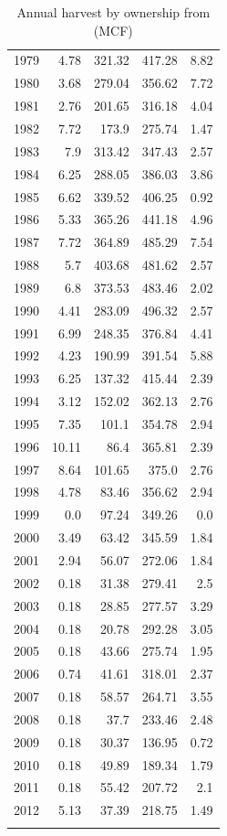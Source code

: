 \documentclass[a4paper,titlepage]{article}
\begin{document}
\begin{longtable}{rrrrr}
1979 & 4.78 & 321.32 & 417.28 & 8.82\\
1980 & 3.68 & 279.04 & 356.62 & 7.72\\
1981 & 2.76 & 201.65 & 316.18 & 4.04\\
1982 & 7.72 & 173.9 & 275.74 & 1.47\\
1983 & 7.9 & 313.42 & 347.43 & 2.57\\
1984 & 6.25 & 288.05 & 386.03 & 3.86\\
1985 & 6.62 & 339.52 & 406.25 & 0.92\\
1986 & 5.33 & 365.26 & 441.18 & 4.96\\
1987 & 7.72 & 364.89 & 485.29 & 7.54\\
1988 & 5.7 & 403.68 & 481.62 & 2.57\\
1989 & 6.8 & 373.53 & 483.46 & 2.02\\
1990 & 4.41 & 283.09 & 496.32 & 2.57\\
1991 & 6.99 & 248.35 & 376.84 & 4.41\\
1992 & 4.23 & 190.99 & 391.54 & 5.88\\
1993 & 6.25 & 137.32 & 415.44 & 2.39\\
1994 & 3.12 & 152.02 & 362.13 & 2.76\\
1995 & 7.35 & 101.1 & 354.78 & 2.94\\
1996 & 10.11 & 86.4 & 365.81 & 2.39\\
1997 & 8.64 & 101.65 & 375.0 & 2.76\\
1998 & 4.78 & 83.46 & 356.62 & 2.94\\
1999 & 0.0 & 97.24 & 349.26 & 0.0\\
2000 & 3.49 & 63.42 & 345.59 & 1.84\\
2001 & 2.94 & 56.07 & 272.06 & 1.84\\
2002 & 0.18 & 31.38 & 279.41 & 2.5\\
2003 & 0.18 & 28.85 & 277.57 & 3.29\\
2004 & 0.18 & 20.78 & 292.28 & 3.05\\
2005 & 0.18 & 43.66 & 275.74 & 1.95\\
2006 & 0.74 & 41.61 & 318.01 & 2.37\\
2007 & 0.18 & 58.57 & 264.71 & 3.55\\
2008 & 0.18 & 37.7 & 233.46 & 2.48\\
2009 & 0.18 & 30.37 & 136.95 & 0.72\\
2010 & 0.18 & 49.89 & 189.34 & 1.79\\
2011 & 0.18 & 55.42 & 207.72 & 2.1\\
2012 & 5.13 & 37.39 & 218.75 & 1.49\\
\caption{Annual harvest by ownership from \citet{Mciver2012} (MCF)\label{tab:MandM}}
\\
\end{longtable}
\end{document}
